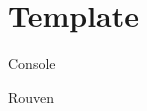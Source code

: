\section{Template}


\begin{algorithm}{Console}
\end{algorithm}

\begin{algorithm}{Rouven}
\end{algorithm}
